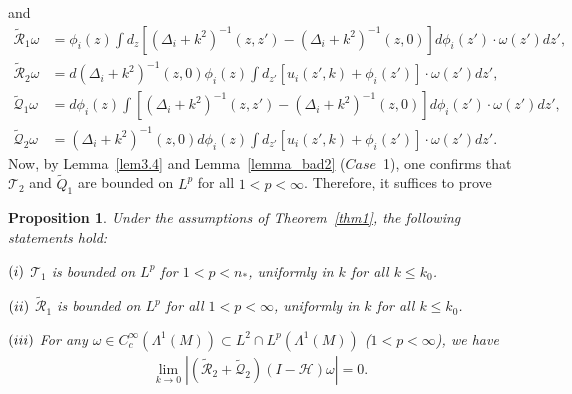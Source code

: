 \documentclass[12pt]{amsart}
\newtheorem{proposition}[theorem]{Proposition}
\begin{document}
and
\begin{align*}
    \tilde{\mathcal{R}}_1\omega &= \phi_i(z) \int  d_{z}\left[(\Delta_i + k^2)^{-1}(z,z') - (\Delta_i + k^2)^{-1}(z,0)\right] d\phi_i(z') \cdot \omega(z') dz',\\
    \tilde{\mathcal{R}}_2\omega &= d(\Delta_i+k^2)^{-1}(z,0) \phi_i(z) \int d_{z'}\left[u_i(z',k) +  \phi_i(z')\right] \cdot \omega(z') dz',\\
    \tilde{\mathcal{Q}}_1\omega &= d\phi_i(z) \int \left[ (\Delta_i + k^2)^{-1}(z,z') - (\Delta_i + k^2)^{-1}(z,0) \right] d\phi_i(z') \cdot \omega(z')dz',\\
    \tilde{\mathcal{Q}}_2\omega &= (\Delta_i+k^2)^{-1}(z,0) d\phi_i(z) \int d_{z'}\left[u_i(z',k) +  \phi_i(z')\right] \cdot \omega(z') dz'.
\end{align*}
Now, by Lemma~\ref{lem3.4} and Lemma~\ref{lemma_bad2} ($\textit{Case}$~1), one confirms that $\mathcal{T}_2$ and $\tilde{Q}_1$ are bounded on $L^p$ for all $1<p<\infty$. Therefore, it suffices to prove


\begin{proposition}\label{prop_alter1}
Under the assumptions of Theorem~\ref{thm1}, the following statements hold:

$(\romannumeral1)$ $\mathcal{T}_1$ is bounded on $L^p$ for $1<p<n_*$, uniformly in $k$ for all $k \le k_0$.

$(\romannumeral2)$ $\tilde{\mathcal{R}}_1$ is bounded on $L^p$ for all $1<p<\infty$, uniformly in $k$ for all $k \le k_0$.

$(\romannumeral3)$ For any $\omega \in C_c^\infty(\Lambda^1(M)) \subset L^2\cap L^{p}(\Lambda^1(M))$ ($1<p<\infty$), we have
\begin{align*}
\lim_{k\to 0} \left|\left( \tilde{\mathcal{R}}_2 + \tilde{\mathcal{Q}}_2 \right)  (I-\mathcal{H})\omega \right| = 0.
\end{align*}

\end{proposition}
\end{document}
